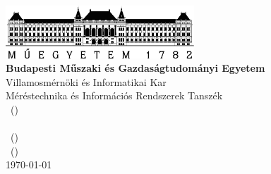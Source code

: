 
\begin{titlepage}

\begin{center}
\includegraphics[width=200pt,keepaspectratio]{figures/BMElogo.png}\\
\vspace{0.3cm}
\textbf{Budapesti Műszaki és Gazdaságtudományi Egyetem}\\
\textmd{Villamosmérnöki és Informatikai Kar}\\
\textmd{Méréstechnika és Információs Rendszerek Tanszék}\\
\textmd{\course \ (\coursecode)}\\[5cm]

{\huge \bfseries \hwtitle}\\[0.8cm]
\vspace{0.5cm}
\textsc{\Large \authorname \ (\authorneptun)}\\[0.2cm]
\textsc{\Large \authornameb \ (\authorneptunb)}\\[4cm]

\vspace{4cm}
\textsc{\Large \today}\\


\end{center}

\end{titlepage}


